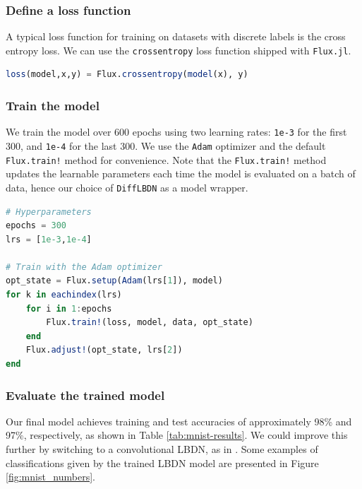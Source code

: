 \subsubsection{Define a loss function} \label{sec:mnist-loss}

A typical loss function for training on datasets with discrete labels is the cross entropy loss. We can use the \verb|crossentropy| loss function shipped with \verb|Flux.jl|.

\begin{lstlisting}[language = Julia]
loss(model,x,y) = Flux.crossentropy(model(x), y)
\end{lstlisting}

\subsubsection{Train the model} \label{sec:mnist-train}

We train the model over 600 epochs using two learning rates: \verb|1e-3| for the first 300, and \verb|1e-4| for the last 300. We use the \verb|Adam| optimizer \cite{Kingma+Ba2015} and the default \verb|Flux.train!| method for convenience. Note that the \verb|Flux.train!| method updates the learnable parameters each time the model is evaluated on a batch of data, hence our choice of \verb|DiffLBDN| as a model wrapper.

\begin{lstlisting}[language = Julia]
# Hyperparameters
epochs = 300
lrs = [1e-3,1e-4]

# Train with the Adam optimizer
opt_state = Flux.setup(Adam(lrs[1]), model)
for k in eachindex(lrs)
    for i in 1:epochs
        Flux.train!(loss, model, data, opt_state)
    end
    Flux.adjust!(opt_state, lrs[2])
end
\end{lstlisting}

\subsubsection{Evaluate the trained model} \label{sec:mnist-evaluate}

Our final model achieves training and test accuracies of approximately 98\% and 97\%, respectively, as shown in Table \ref{tab:mnist-results}. We could improve this further by switching to a convolutional LBDN, as in \cite{Wang+Manchester2023}. Some examples of classifications given by the trained LBDN model are presented in Figure \ref{fig:mnist_numbers}.

